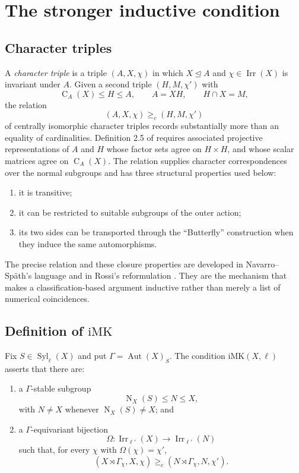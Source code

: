 \documentclass[11pt]{article}
\newcommand{\Irr}{\operatorname{Irr}}
\newcommand{\Aut}{\operatorname{Aut}}
\newcommand{\Norm}{\operatorname{N}}
\newcommand{\Cent}{\operatorname{C}}
\newcommand{\Syl}{\operatorname{Syl}}
\newcommand{\IMK}{\mathrm{iMK}}
\begin{document}
\section{The stronger inductive condition}

\subsection{Character triples}

A \emph{character triple} is a triple \((A,X,\chi)\) in which
\(X\trianglelefteq A\) and \(\chi\in\Irr(X)\) is invariant under \(A\).
Given a second triple \((H,M,\chi')\) with
\[
  \Cent_A(X)\leq H\leq A,\qquad A=XH,\qquad H\cap X=M,
\]
the relation
\[
  (A,X,\chi)\geq_c(H,M,\chi')
\]
of centrally isomorphic character triples records substantially more than
an equality of cardinalities.  Definition 2.5 of
\cite{CabanesSpath2026} requires associated projective representations
of \(A\) and \(H\) whose factor sets agree on \(H\times H\), and whose
scalar matrices agree on \(\Cent_A(X)\).  The relation supplies character
correspondences over the normal subgroups and has three structural
properties used below:

\begin{enumerate}[label=(\roman*)]
  \item it is transitive;
  \item it can be restricted to suitable subgroups of the outer action;
  \item its two sides can be transported through the ``Butterfly''
        construction when they induce the same automorphisms.
\end{enumerate}

The precise relation and these closure properties are developed in
Navarro--Sp{\"a}th's language and in Rossi's reformulation
\cite{Rossi2023,Navarro2018}.  They are the mechanism that makes a
classification-based argument inductive rather than merely a list of
numerical coincidences.

\subsection{\texorpdfstring{Definition of \(\IMK\)}{Definition of iMK}}

Fix \(S\in\Syl_\ell(X)\) and put
\(\Gamma=\Aut(X)_S\).  The condition \(\IMK(X,\ell)\) asserts that there
are:

\begin{enumerate}
  \item a \(\Gamma\)-stable subgroup
  \[
    \Norm_X(S)\leq N\leq X,
  \]
  with \(N\neq X\) whenever \(\Norm_X(S)\neq X\); and
  \item a \(\Gamma\)-equivariant bijection
  \[
    \Omega:\Irr_{\ell'}(X)\longrightarrow\Irr_{\ell'}(N)
  \]
  such that, for every \(\chi\) with \(\Omega(\chi)=\chi'\),
  \[
    (X\rtimes\Gamma_\chi,X,\chi)
      \geq_c
    (N\rtimes\Gamma_\chi,N,\chi').
  \]
\end{enumerate}
\end{document}
